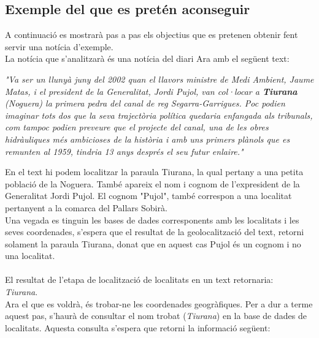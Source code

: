 \documentclass[12pt,a4paper,openright,oneside]{article}
\numberwithin{equation}{section}
\theoremstyle{definition}
\begin{document}
\subsection{Exemple del que es pretén aconseguir}
A continuació es mostrarà pas a pas els objectius que es pretenen obtenir fent servir una notícia d'exemple.\\
La notícia que s'analitzarà és una notícia del diari Ara amb el següent text:
\begin{center}
\emph{"Va ser un llunyà juny del 2002 quan el llavors ministre de Medi Ambient, Jaume Matas, i el president de la Generalitat, Jordi Pujol, van col·locar a \textbf{Tiurana} (Noguera) la primera pedra del canal de reg Segarra-Garrigues. Poc podien imaginar tots dos que la seva trajectòria política quedaria enfangada als tribunals, com tampoc podien preveure que el projecte del canal, una de les obres hidràuliques més ambicioses de la història i amb uns primers plànols que es remunten al 1959, tindria 13 anys després el seu futur enlaire."\cite{ara}}
\end{center}
En el text hi podem localitzar la paraula Tiurana, la qual pertany a una petita població de la Noguera. També apareix el nom i cognom de l'expresident de la Generalitat Jordi Pujol. El cognom "Pujol", també correspon a una localitat pertanyent a la comarca del Pallars Sobirà.\\
Una vegada es tinguin les bases de dades corresponents amb les localitats i les seves coordenades, s'espera que el resultat de la geolocalització del text, retorni solament la paraula Tiurana, donat que en aquest cas Pujol és un cognom i no una localitat.\\\\
El resultat de l'etapa de localització de localitats en un text retornaria: \\\emph{Tiurana}. \\ 
Ara el que es voldrà, és trobar-ne les coordenades geogràfiques. Per a dur a terme aquest pas, s'haurà de consultar el nom trobat (\emph{Tiurana}) en la base de dades de localitats. Aquesta consulta s'espera que retorni la informació següent:
\end{document}
